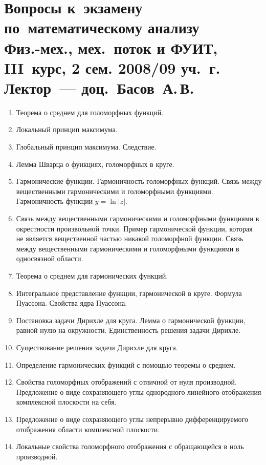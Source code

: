\documentclass[a4paper,10pt]{article}
\begin{document}
\section*{Вопросы к~экзамену по~математическому анализу \\%
Физ.-мех., мех.~поток и ФУИТ, III~курс, 2 сем. 2008/09 уч.~г.\\%
Лектор~--- доц.~Басов~А.\,В.}

\begin{enumerate}
  \setlength{\itemsep}{-0.1mm} %

  \item Теорема о среднем для голоморфных функций.
  \item Локальный принцип максимума.
  \item Глобальный принцип максимума.
        Следствие.
  \item Лемма Шварца о функциях, голоморфных в круге.
  \item Гармонические функции.
        Гармоничность голоморфных функций.
        Связь между вещественными гармоническими и голоморфными функциями.
        Гармоничность функции $y = \ln |z|$.
  \item Связь между вещественными гармоническими и голоморфными функциями в окрестности произвольной точки.
        Пример гармонической функции, которая не является вещественной частью никакой голоморфной функции.
        Связь между вещественными гармоническими и голоморфными функциями в односвязной области.
  \item Теорема о среднем для гармонических функций.
  \item Интегральное представление функции, гармонической в круге.
        Формула Пуассона.
        Свойства ядра Пуассона.
  \item Постановка задачи Дирихле для круга.
        Лемма о гармонической функции, равной нулю на окружности.
        Единственность решения задачи Дирихле.
  \item Существование решения задачи Дирихле для круга.
  \item Определение гармонических функций с помощью теоремы о среднем.
  \item Свойства голоморфных отображений с отличной от нуля производной.
        Предложение о виде сохраняющего углы однородного линейного отображения комплексной плоскости на себя.
  \item Предложение о виде сохраняющего углы непрерывно дифференцируемого отображения области комплексной плоскости.
  \item Локальные свойства голоморфного отображения с обращающейся в ноль производной.

\end{enumerate}
\end{document}
